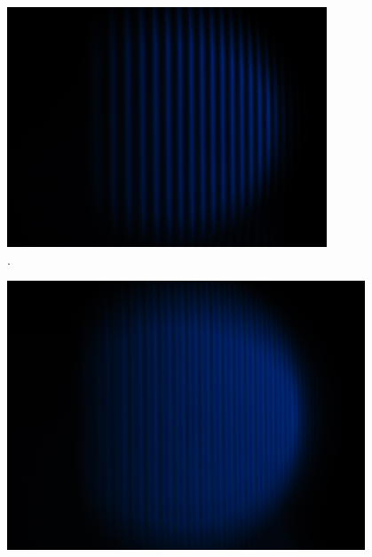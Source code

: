 \begin{figure}[h!]
  \centering
  \includegraphics[width=0.85\textwidth]{data/temp/blau_ohneB_0.JPG}
  \caption{\cite{insert Beschriftung 9}.}
  \label{fig:blauOhneB0}
\end{figure}
\begin{figure}[h!]
  \centering
  \includegraphics[width=0.95\textwidth]{data/temp/blau_mitB_0.JPG}
  \caption{\cite{insert Beschriftung 10}}
  \label{fig:blauMitB0}
\end{figure}

